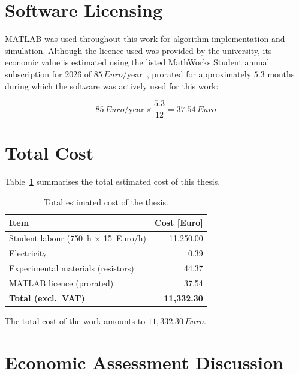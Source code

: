 \section{Software Licensing}

MATLAB was used throughout this work for algorithm implementation and 
simulation. Although the licence used was provided by the university, 
its economic value 
is estimated using the listed MathWorks Student annual subscription for 2026 of 
$85\,Euro/\text{year}$~\cite{matlabpricing2026}, 
prorated for approximately $5.3$ months during which the software was actively used for 
this work:

\begin{equation}
    85\,Euro/\text{year} \times \frac{5.3}{12} = 37.54\,Euro
\end{equation}

\section{Total Cost}

Table~\ref{tab:TotalCost} summarises the total estimated cost of this thesis.

\begin{table}[H]
    \centering
    \begin{tabular}{lr}
        \toprule
        \textbf{Item} & \textbf{Cost [Euro]} \\
        \midrule
        Student labour (750~h $\times$ 15~Euro/h)     & 11{,}250.00 \\
        Electricity                                 &      0.39 \\
        Experimental materials (resistors)          &     44.37 \\
        MATLAB licence (prorated)              &     37.54 \\
        \midrule
        \textbf{Total (excl.\ VAT)}                 & \textbf{11{,}332.30} \\
        \bottomrule
    \end{tabular}
    \caption{Total estimated cost of the thesis.}
    \label{tab:TotalCost}
\end{table}

The total cost of the work amounts to $11{,}332.30\,Euro$.

\section{Economic Assessment Discussion}

